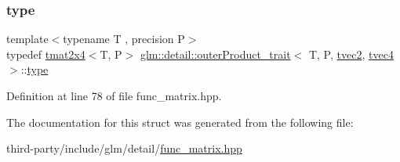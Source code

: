 \subsubsection{\texorpdfstring{type}{type}}
{\footnotesize\ttfamily template$<$typename T , precision P$>$ \\
typedef \hyperlink{structglm_1_1detail_1_1tmat2x4}{tmat2x4}$<$T, P$>$ \hyperlink{structglm_1_1detail_1_1outer_product__trait}{glm\+::detail\+::outer\+Product\+\_\+trait}$<$ T, P, \hyperlink{structglm_1_1detail_1_1tvec2}{tvec2}, \hyperlink{structglm_1_1detail_1_1tvec4}{tvec4} $>$\+::\hyperlink{structglm_1_1detail_1_1outer_product__trait_3_01_t_00_01_p_00_01tvec2_00_01tvec4_01_4_a5ca49ab58d1c30d858b622c06147cd57}{type}}



Definition at line 78 of file func\+\_\+matrix.\+hpp.



The documentation for this struct was generated from the following file\+:\begin{DoxyCompactItemize}
\item 
third-\/party/include/glm/detail/\hyperlink{func__matrix_8hpp}{func\+\_\+matrix.\+hpp}\end{DoxyCompactItemize}
